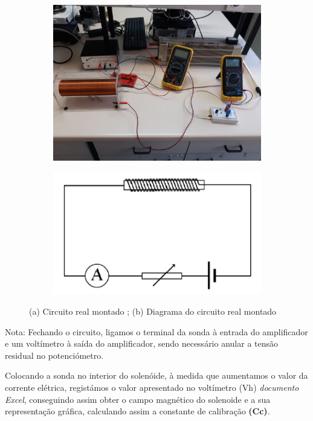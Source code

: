 \begin{figure}[H]
		\centering
		\begin{subfigure}[t]{0.45\textwidth}
			\centering
			\includegraphics[scale=0.15]{./circuito_A.jpeg}
			\caption{}
		\end{subfigure}
		\begin{subfigure}[t]{0.45\textwidth}
			\centering
			{\includegraphics[scale=0.6]{./circuito1.png}}
			\caption{}
			\end{subfigure}	
		\caption{(a) Circuito real montado ; (b) Diagrama do circuito real montado }
	\end{figure}

\small 
Nota: Fechando o circuito, ligamos o terminal da sonda à entrada do amplificador e um voltímetro à saída do amplificador, sendo necessário anular a tensão residual no potenciómetro. \\
\normalsize 
\par Colocando a sonda no interior do solenóide, à medida que aumentamos o valor da corrente elétrica, registámos o valor apresentado no voltímetro (Vh) \textit{documento Excel}, conseguindo assim obter o campo magnético do solenoide e a sua representação gráfica, calculando assim a constante de calibração \textbf{(Cc)}. \\

